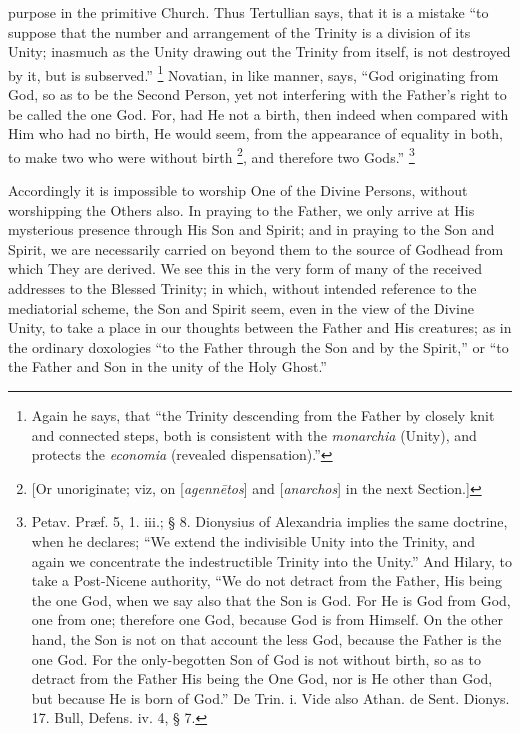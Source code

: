 purpose in the primitive Church. Thus Tertullian says, that it is a
mistake ``to suppose that the number and arrangement of the
Trinity is a division of its Unity; inasmuch as the Unity drawing out
the Trinity from itself, is not destroyed by it, but is subserved.''
\footnote{Again he says, that ``the Trinity
descending from the Father by closely knit and connected steps, both
is consistent with the \emph{monarchia} (Unity), and protects the \emph{economia}
(revealed dispensation).''} Novatian, in like
manner, says, ``God originating from God, so as to be the Second
Person, yet not interfering with the Father's right to be called the
one God. For, had He not a birth, then indeed when compared with
Him who had no birth, He would seem, from the appearance of equality
in both, to make two who were without birth \footnote{[Or unoriginate; viz, on [\emph{agenn\={e}tos}]
and [\emph{anarchos}] in the next Section.]}, and therefore two Gods.'' \footnote{Petav. Præf. 5, 1. iii.; § 8. Dionysius
of Alexandria implies the same doctrine, when he declares; ``We
extend the indivisible Unity into the Trinity, and again we
concentrate the indestructible Trinity into the Unity.'' And
Hilary, to take a Post-Nicene authority, ``We do not detract from
the Father, His being the one God, when we say also that the Son is
God. For He is God from God, one from one; therefore one God, because
God is from Himself. On the other hand, the Son is not on that account
the less God, because the Father is the one God. For the only-begotten
Son of God is not without birth, so as to detract from the Father His
being the One God, nor is He other than God, but because He is born of
God.'' De Trin. i. Vide also Athan. de Sent. Dionys. 17. Bull,
Defens. iv. 4, § 7.}

Accordingly it is impossible to worship One of the Divine Persons,
without worshipping the Others also. In praying to the Father, we only
arrive at His mysterious presence through His Son and Spirit; and in
praying to the Son and Spirit, we are necessarily carried on beyond
them to the source of Godhead from which They are derived. We see this
in the very form of many of the received addresses to the Blessed
Trinity; in which, without intended reference to the mediatorial
scheme, the Son and Spirit seem, even in the view of the Divine Unity,
to take a place in our thoughts between the Father and His creatures;
as in the ordinary doxologies ``to the Father through the Son and
by the Spirit,'' or ``to the Father and Son in the unity of
the Holy Ghost.''

